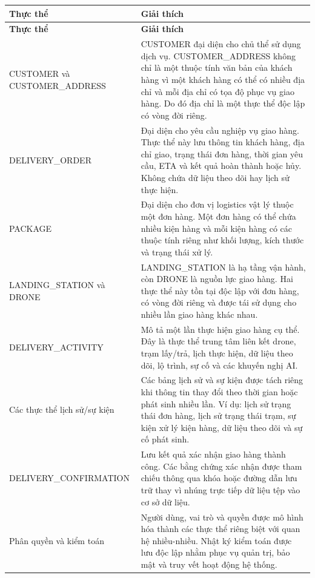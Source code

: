 \renewcommand{\arraystretch}{1.2} \small \begin{longtable}{|p{5cm}|p{10.45cm}|} \hline \textbf{Thực thể} & \textbf{Giải thích} \\ \hline \endfirsthead \hline \textbf{Thực thể} & \textbf{Giải thích} \\ \hline \endhead CUSTOMER và CUSTOMER\_ADDRESS & CUSTOMER đại diện cho chủ thể sử dụng dịch vụ. CUSTOMER\_ADDRESS không chỉ là một thuộc tính văn bản của khách hàng vì một khách hàng có thể có nhiều địa chỉ và mỗi địa chỉ có tọa độ phục vụ giao hàng. Do đó địa chỉ là một thực thể độc lập có vòng đời riêng. \\ \hline DELIVERY\_ORDER & Đại diện cho yêu cầu nghiệp vụ giao hàng. Thực thể này lưu thông tin khách hàng, địa chỉ giao, trạng thái đơn hàng, thời gian yêu cầu, ETA và kết quả hoàn thành hoặc hủy. Không chứa dữ liệu theo dõi hay lịch sử thực hiện. \\ \hline PACKAGE & Đại diện cho đơn vị logistics vật lý thuộc một đơn hàng. Một đơn hàng có thể chứa nhiều kiện hàng và mỗi kiện hàng có các thuộc tính riêng như khối lượng, kích thước và trạng thái xử lý. \\ \hline LANDING\_STATION và DRONE & LANDING\_STATION là hạ tầng vận hành, còn DRONE là nguồn lực giao hàng. Hai thực thể này tồn tại độc lập với đơn hàng, có vòng đời riêng và được tái sử dụng cho nhiều lần giao hàng khác nhau. \\ \hline DELIVERY\_ACTIVITY & Mô tả một lần thực hiện giao hàng cụ thể. Đây là thực thể trung tâm liên kết drone, trạm lấy/trả, lịch thực hiện, dữ liệu theo dõi, lộ trình, sự cố và các khuyến nghị AI. \\ \hline Các thực thể lịch sử/sự kiện & Các bảng lịch sử và sự kiện được tách riêng khi thông tin thay đổi theo thời gian hoặc phát sinh nhiều lần. Ví dụ: lịch sử trạng thái đơn hàng, lịch sử trạng thái trạm, sự kiện xử lý kiện hàng, dữ liệu theo dõi và sự cố phát sinh. \\ \hline DELIVERY\_CONFIRMATION & Lưu kết quả xác nhận giao hàng thành công. Các bằng chứng xác nhận được tham chiếu thông qua khóa hoặc đường dẫn lưu trữ thay vì nhúng trực tiếp dữ liệu tệp vào cơ sở dữ liệu. \\ \hline Phân quyền và kiểm toán & Người dùng, vai trò và quyền được mô hình hóa thành các thực thể riêng biệt với quan hệ nhiều-nhiều. Nhật ký kiểm toán được lưu độc lập nhằm phục vụ quản trị, bảo mật và truy vết hoạt động hệ thống. \\ \hline \end{longtable}

